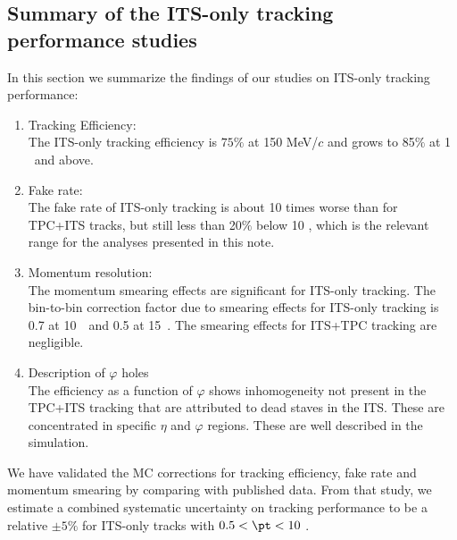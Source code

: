 \subsection{Summary of the ITS-only tracking performance studies} 
In this section we summarize the findings of our studies on ITS-only tracking performance: 
\begin{enumerate}
\item Tracking Efficiency: \\
The ITS-only tracking efficiency is $75\%$ at 150 MeV/$c$ and grows to 85$\%$ at 1 \GeVc~and above. 
\item Fake rate:\\
The fake rate of ITS-only tracking is about 10 times worse than for TPC+ITS tracks, but still less than 20$\%$ below 10 \GeVc, which is the relevant range for the analyses presented in this note.
\item Momentum resolution:\\
The momentum smearing effects are significant for ITS-only tracking. The bin-to-bin correction factor due to smearing effects for ITS-only tracking is 0.7 at 10~\GeVc~and 0.5 at 15~\GeVc. The smearing effects for ITS+TPC tracking are negligible.
\item Description of $\varphi$ holes\\
The efficiency as a function of $\varphi$ shows inhomogeneity not present in the TPC+ITS tracking that are attributed to dead staves in the ITS. These are concentrated in specific $\eta$ and $\varphi$ regions. These are well described in the simulation. 
\end{enumerate}

We have validated the MC corrections for tracking efficiency, fake rate and momentum smearing by comparing with published data. From that study, we estimate a combined systematic uncertainty on tracking performance to be a relative $\pm 5\%$ for ITS-only tracks with $0.5 < \pt < 10$ \GeVc. 

